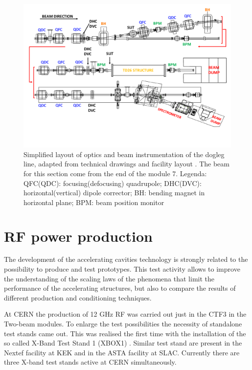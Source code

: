 \begin{landscape}
\begin{figure}
\centering 
\includegraphics[scale=0.78]{pictures/modified_pets.pdf}
\caption{Simplified layout of optics and beam instrumentation of the dogleg line, adapted from technical drawings and facility layout \cite{EDMS:CTF3}. The beam for this section come from the end of the module 7. Legenda: QFC(QDC): focusing(defocusing) quadrupole; DHC(DVC): horizontal(vertical) dipole corrector; BH: bending magnet in horizontal plane; BPM: beam position monitor}
\label{dolaut}
\end{figure}
\end{landscape}



\section[RF power production]{RF power production}

The development of the accelerating cavities technology is strongly related to the possibility to produce and test prototypes. This test activity allows to improve the understanding of the scaling laws of the phenomena that limit the performance of the accelerating structures, but also to compare the results of different production and conditioning techniques. 

At CERN the production of 12 GHz RF was carried out just in the CTF3 in the Two-beam modules. To enlarge the test possibilities the necessity of standalone test stands came out. This was realised the first time with the installation of the so called X-Band Test Stand 1 (XBOX1) \cite{Peauger:1287901}. Similar test stand are present in the Nextef facility at KEK and in the ASTA facility at SLAC. Currently there are three X-band test stands active at CERN simultaneously.

